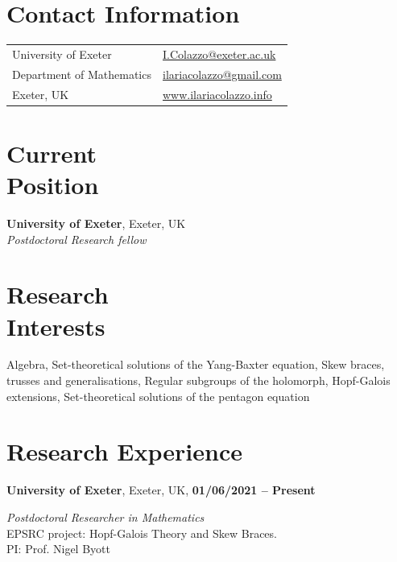 \documentclass[margin,line]{res}
\newenvironment{list2}{
  \begin{list}{$\bullet$}{%
      \setlength{\itemsep}{-0in}
      \setlength{\parsep}{0in} \setlength{\parskip}{0in}
      \setlength{\topsep}{0in} \setlength{\partopsep}{0in} 
      \setlength{\leftmargin}{0.2in}}}{\end{list}}
\begin{document}

\begin{resume}
\small
\section{\sc Contact Information}
\vspace{.05in}
\begin{tabular}{@{}p{4in}p{8in}}
University of Exeter  &  \href{mailto:I.Colazzo@exeter.ac.uk}{I.Colazzo@exeter.ac.uk} \\       
Department of Mathematics& \href{mailto:ilariacolazzo@gmail.com}{ilariacolazzo@gmail.com}\\
Exeter, UK &  \href{https://www.ilariacolazzo.info}{www.ilariacolazzo.info} \\
\end{tabular}

\section{\sc Current \\Position}
{\bf  University of Exeter}, Exeter, UK\\ %
{\em Postdoctoral Research fellow} 
{}\\
\vspace*{-.1in}

\section{\sc Research\\ Interests} 

Algebra,
Set-theoretical solutions of the Yang-Baxter equation,
Skew braces, trusses and generalisations,
Regular subgroups of the holomorph,
Hopf-Galois extensions,
Set-theoretical solutions of the pentagon equation

\section{\sc Research Experience}

{\bf University of Exeter}, Exeter, UK, \hfill {\bf 01/06/2021 -- Present}

\vspace{-.3cm}
{\em Postdoctoral Researcher in Mathematics} \\
{EPSRC project: Hopf-Galois Theory and Skew Braces.  }\\
{PI: Prof. Nigel Byott}
\vspace{3pt}



\end{resume}
\end{document}
